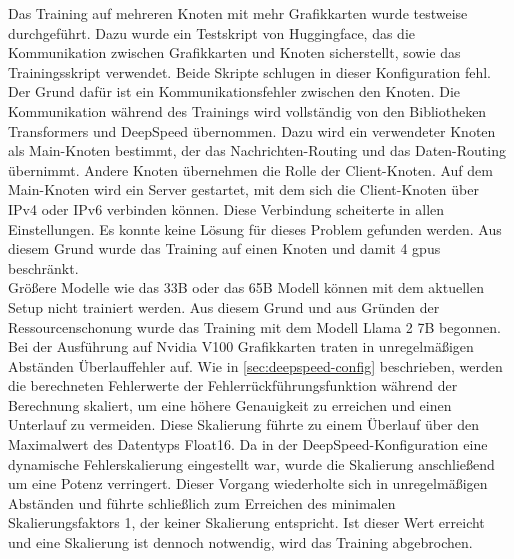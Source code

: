 Das Training auf mehreren Knoten mit mehr Grafikkarten wurde testweise durchgeführt.
Dazu wurde ein Testskript von Huggingface, das die Kommunikation zwischen Grafikkarten und Knoten sicherstellt, sowie das Trainingsskript verwendet.
Beide Skripte schlugen in dieser Konfiguration fehl.
Der Grund dafür ist ein Kommunikationsfehler zwischen den Knoten.
Die Kommunikation während des Trainings wird vollständig von den Bibliotheken Transformers und DeepSpeed übernommen.
Dazu wird ein verwendeter Knoten als Main-Knoten bestimmt, der das Nachrichten-Routing und das Daten-Routing übernimmt.
Andere Knoten übernehmen die Rolle der Client-Knoten.
Auf dem Main-Knoten wird ein Server gestartet, mit dem sich die Client-Knoten über IPv4 oder IPv6 verbinden können.
Diese Verbindung scheiterte in allen Einstellungen.
Es konnte keine Lösung für dieses Problem gefunden werden.
Aus diesem Grund wurde das Training auf einen Knoten und damit 4 \ac{gpu}s beschränkt.\\

Größere Modelle wie das 33B oder das 65B Modell können mit dem aktuellen Setup nicht trainiert werden.
Aus diesem Grund und aus Gründen der Ressourcenschonung wurde das Training mit dem Modell Llama 2 7B begonnen.
Bei der Ausführung auf Nvidia V100 Grafikkarten traten in unregelmäßigen Abständen Überlauffehler auf.
Wie in \cref{sec:deepspeed-config} beschrieben, werden die berechneten Fehlerwerte der Fehlerrückführungsfunktion während der Berechnung skaliert, um eine höhere Genauigkeit zu erreichen und einen Unterlauf zu vermeiden.
Diese Skalierung führte zu einem Überlauf über den Maximalwert des Datentyps Float16.
Da in der DeepSpeed-Konfiguration eine dynamische Fehlerskalierung eingestellt war, wurde die Skalierung anschließend um eine Potenz verringert.
Dieser Vorgang wiederholte sich in unregelmäßigen Abständen und führte schließlich zum Erreichen des minimalen Skalierungsfaktors 1, der keiner Skalierung entspricht.
Ist dieser Wert erreicht und eine Skalierung ist dennoch notwendig, wird das Training abgebrochen.

